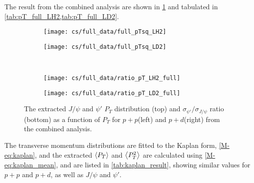 \documentclass[../main.tex]{subfiles}
\begin{document}
The result from the combined analysis are shown in \cref{fig:pT_combined} and tabulated in \cref{tab:pT_full_LH2,tab:pT_full_LD2}.
\begin{figure}[h!]
	\centering
	\begin{subfigure}{0.45\linewidth}
		\texttt{[image: cs/full\_data/full\_pTsq\_LH2]}
	\end{subfigure}
	\begin{subfigure}{0.45\linewidth}
		\texttt{[image: cs/full\_data/full\_pTsq\_LD2]}
	\end{subfigure}
	\\
	\begin{subfigure}{0.45\linewidth}
		\texttt{[image: cs/full\_data/ratio\_pT\_LH2\_full]}
	\end{subfigure}
	\begin{subfigure}{0.45\linewidth}
		\texttt{[image: cs/full\_data/ratio\_pT\_LD2\_full]}
	\end{subfigure}
	\caption{The extracted $J/\psi$ and $\psi'$ $P_T$ distribution (top) and $\sigma_{\psi'}/\sigma_{J/\psi}$
		ratio (bottom) as a function of $P_T$ for $p+p$(left) and $p+d$(right) from
		the combined analysis.}
	\label{fig:pT_combined}
\end{figure}
\begin{table}[h!]
	\centering
	\caption{Cross section $d\sigma/dp^2_T$ (in \unit{\nano\barn\GeV^{-2} nucleon^{-1}}) and the
		$\sigma_{\psi'}/\sigma_{J/\psi}$ ratio for $p+p$ extracted from the combined analysis, with
		their statistical and systematic uncertainties and the $\expval{p_T}$ (in \unit{\GeV})in each bin.}
	
	\label{tab:pT_full_LH2}
\end{table}
\begin{table}[h!]
	\centering
	\caption{Cross section $d\sigma/dp^2_T$ (in \unit{\nano\barn\GeV^{-2} nucleon^{-1}}) and the
		$\sigma_{\psi'}/\sigma_{J/\psi}$ ratio for $p+d$ extracted from the combined analysis, with
		their statistical and systematic uncertainties and the $\expval{p_T}$ (in \unit{\GeV})in each bin.}
	
	\label{tab:pT_full_LD2}
\end{table}

The transverse momentum distributions are fitted to the Kaplan form, \cref{M-eq:kaplan}, and the extracted
$\expval{P_T}$ and $\expval{P^2_T}$ are calculated using \cref{M-eq:kaplan_mean},
and are listed in \cref{tab:kaplan_result}, showing similar values for $p+p$ and $p+d$,
as well as $J/\psi$ and $\psi'$.
\end{document}
